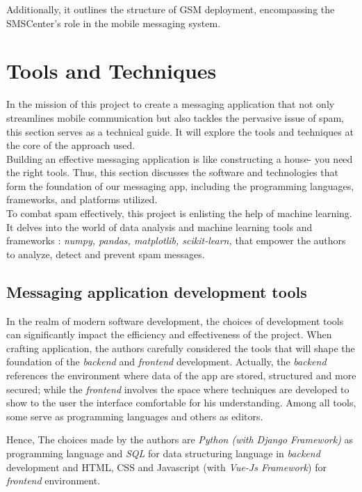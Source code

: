 \documentclass[12pt,a4paper]{report}
\begin{document}
    Additionally, it outlines the structure of GSM deployment, encompassing the SMSCenter's role in the mobile messaging system.
   
   
    
   \section{Tools and Techniques} 
	In the mission of this project to create a messaging application that not only streamlines mobile communication but also tackles the pervasive issue of spam, this section serves as a technical guide. It will explore the tools and techniques at the core of the approach used. \\
		
	Building an effective messaging application is like constructing a house- you need the right tools. Thus, this section discusses the software and technologies that form the foundation of our messaging app, including the programming languages, frameworks, and platforms utilized. \\
	
	To combat spam effectively, this project is enlisting the help of machine learning. It delves into the world of data analysis and machine learning tools and frameworks : \textit{numpy, pandas, matplotlib, scikit-learn,} that empower the authors to analyze, detect and prevent spam messages.\\
	
	\subsection{Messaging application development tools}
	In the realm of modern software development, the choices of development tools can significantly impact the efficiency and effectiveness of the project. When crafting application, the authors carefully considered the tools that will shape the foundation of the \textit{backend} and \textit{frontend} development. Actually, the \textit{backend} references the environment where data of the app are stored, structured and more secured; while the \textit{frontend} involves the space where techniques are developed to show to the user the interface comfortable for his understanding. Among all tools, some serve as programming languages and others as editors. 
	
	Hence, The choices made by the authors are \textit{Python (with Django \textit{Framework})} as programming language and \textit{SQL} for data structuring language in \textit{backend} development and HTML, CSS and Javascript (with \textit{Vue-Js Framework}) for \textit{frontend} environment. \\
	
\end{document}
